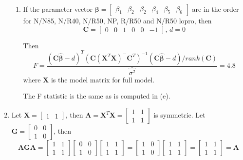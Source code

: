 \documentclass{article}
\begin{document}
\begin{enumerate}[leftmargin = 0 em, label = \arabic*., font = \bfseries]
\begin{enumerate}
		\item 
		If the parameter vector $\bm \beta = \begin{bmatrix}
			\beta_1 &\beta_2& \beta_2& \beta_4& \beta_5 &\beta_6
		\end{bmatrix}$ are in the order for N/N85, N/R40, N/R50, NP, R/R50 and N/R50 lopro, then
		\[\bm C = \begin{bmatrix}
			0 & 0 & 1 & 0 & 0 & -1
		\end{bmatrix},\, d = 0\]

		Then
		\[F = \frac{(\bm C \hat{\bm \beta} - d)^T (\bm C (\bm X^T \bm X)^-\bm C^T)^{-1} (\bm C \bm \hat{\bm\beta} - d)/rank(\bm C)}{\hat{\sigma^2}} = 4.8\]
		where $\bm X$ is the model matrix for full model.

		The F statistic is the same as is computed in (e).
	\end{enumerate}

	\item 
	Let $\bm X = \begin{bmatrix}
		1 & 1
	\end{bmatrix}$, then $\bm A = \bm X^T \bm X = \begin{bmatrix}
		1 & 1\\
		1 & 1
	\end{bmatrix}$ is symmetric. Let $\bm G = \begin{bmatrix}
		0 & 0\\
		1 & 0
	\end{bmatrix}$, then
	\[\bm A \bm G \bm A =
	\begin{bmatrix}
		1 & 1\\
		1 & 1
	\end{bmatrix}
	\begin{bmatrix}
		0 & 0\\
		1 & 0
	\end{bmatrix}
	\begin{bmatrix}
		1 & 1\\
		1 & 1
	\end{bmatrix} = \begin{bmatrix}
		1 & 0\\
		1 & 0
	\end{bmatrix}\begin{bmatrix}
		1 & 1\\
		1 & 1
	\end{bmatrix}
	=
	\begin{bmatrix}
		1 & 1\\
		1 & 1
	\end{bmatrix} = \bm A \]


\end{enumerate}
\end{document}
